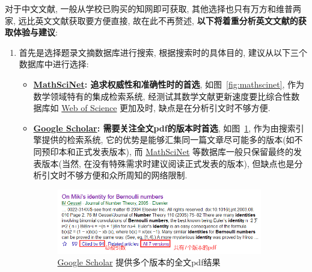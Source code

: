 \documentclass{booki}
\begin{document}
对于中文文献, 一般从学校已购买的知网即可获取, 其他选择也只有万方和维普两家, 远比英文文献获取要方便直接, 故在此不再赘述, \textbf{以下将着重分析英文文献的获取体验与建议}:
\begin{enumerate}
    \item 首先是选择题录文摘数据库进行搜索, 根据搜索时的具体目的, 建议从以下三个数据库中进行选择:
          \begin{itemize}
              \item \textbf{\href{https://mathscinet.ams.org/mathscinet}{MathSciNet}: 追求权威性和准确性时的首选}, 如图~\ref{fig:mathscinet}, 作为数学领域特有的集成检索系统, 经测试其数学文献更新速度要比综合性数据库如 \href{http://apps.webofknowledge.com/}{Web of Science} 更加及时, 缺点是在分析引文时不够方便.

              \item \textbf{\href{https://scholar.google.com/}{Google Scholar}: 需要关注全文pdf的版本时首选}, 如图~\ref{fig:googlesch}, 作为由搜索引擎提供的检索系统, 它的优势是能够汇集同一篇文章尽可能多的版本(如不同预印本和正式发表版本), 而 \href{https://mathscinet.ams.org/mathscinet}{MathSciNet} 等数据库一般只保留最终的发表版本(当然, 在没有特殊需求时建议阅读正式发表的版本), 但缺点也是分析引文时不够方便和众所周知的网络限制.
                                  \begin{figure}[H]
                        \centering
                     \includegraphics[width=0.9\textwidth]{figure/googlescholar.png}
                        \caption{\href{https://scholar.google.com/}{Google Scholar} 提供多个版本的全文pdf结果}
                        \label{fig:googlesch}
                    \end{figure}
                    

\end{itemize}
\end{enumerate}
\end{document}
